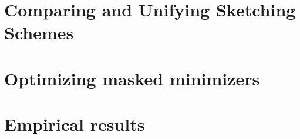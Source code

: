 \label{app:maskmnz}
\section{Comparing and Unifying Sketching Schemes}
  
\section{Optimizing masked minimizers}
  
\section{Empirical results}
  

